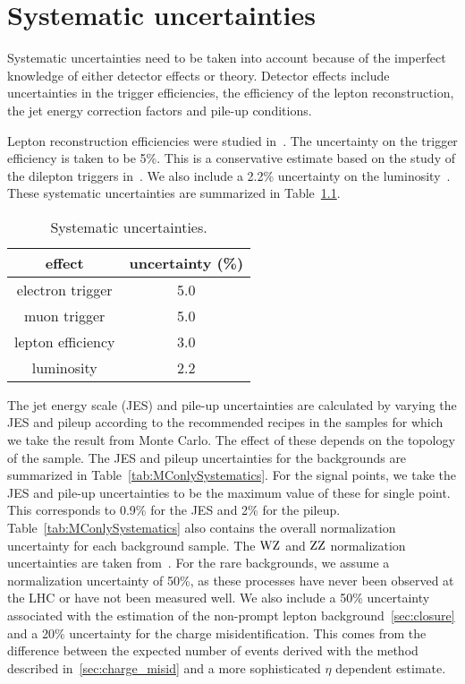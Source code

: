 \chapter{Systematic uncertainties}
Systematic uncertainties need to be taken into account because of the
imperfect knowledge of either detector effects or theory.
Detector effects include uncertainties in the trigger efficiencies, the
efficiency of the lepton reconstruction, the jet energy correction factors
and pile-up conditions.

Lepton reconstruction efficiencies were studied in~\cite{CMS-EXO-12-001}. The uncertainty on the trigger
efficiency is taken to be 5\%. This is a conservative estimate based on the study of the dilepton triggers in~\cite{bprime2011}. We also include a 2.2\% uncertainty 
on the luminosity~\cite{CMS-SMP-12-008}. These systematic uncertainties are summarized in Table~\ref{tab:Systematics}.

\begin{table}
    \centering
\begin{tabular}{*2c}
    \toprule
          effect & uncertainty (\%) \\
          \midrule
  electron trigger          & 5.0 \\
  muon trigger              & 5.0 \\
  lepton efficiency         & 3.0 \\
  luminosity                & 2.2 \\
  \midrule
\end{tabular}
\caption{Systematic uncertainties.}
\label{tab:Systematics}
\end{table}

The jet energy scale (JES) and pile-up uncertainties are calculated by varying the JES and pileup according to the recommended recipes in the samples for which 
we take the result from Monte Carlo. The effect of these depends on the topology of the sample. The JES and pileup uncertainties for the backgrounds are 
summarized in Table~\ref{tab:MConlySystematics}. For the signal points, we
take the JES and pile-up uncertainties to be the maximum value of these for single
point. This corresponds to 0.9\% for the JES and 2\% for the pileup. Table~\ref{tab:MConlySystematics} also
contains the overall normalization uncertainty for each background sample.
The $\mathrm{W}\mathrm{Z}$ and $\mathrm{Z}\mathrm{Z}$ normalization uncertainties are taken from~\cite{CMS-AN-2011-333}. 
For the rare backgrounds, we assume a normalization uncertainty of 50\%, as
these processes have never been observed at the LHC or have not been
measured well. We also include a 50\% uncertainty associated with the
estimation of the non-prompt lepton background~\ref{sec:closure}
and a 20\% uncertainty for the charge misidentification. This comes from the
difference between the expected number of events derived with the method
described in~\ref{sec:charge_misid} and a more sophisticated $\eta$ dependent estimate. 

